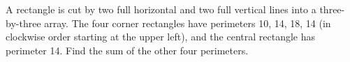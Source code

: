 A rectangle is cut by two full horizontal and two full vertical lines into a three-by-three array. The four corner rectangles have perimeters 10, 14, 18, 14 (in clockwise order starting at the upper left), and the central rectangle has perimeter 14. Find the sum of the other four perimeters.
